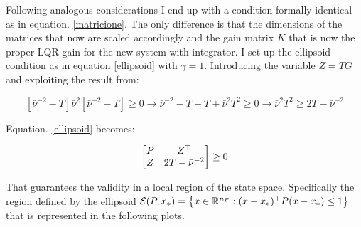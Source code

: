 \documentclass{article}
\begin{document}
Following analogous considerations I end up with a condition formally identical as in equation. \ref{matricione}. The only difference is that the dimensions of the matrices that now are scaled accordingly and the gain matrix $K$ that is now the proper LQR gain for the new system with integrator. I set up the ellipsoid condition as in equation \ref{ellipsoid} with $\gamma = 1$. Introducing the variable $Z = TG$ and exploiting the result from:

$$
  \left[ \bar{\nu}^{-2} - T \right] \bar{\nu}^{2} \left[ \bar{\nu}^{-2} - T \right] \geq 0 \to \bar{\nu}^{-2} - T - T + \bar{\nu}^{2} T^{2} \geq 0 \to \bar{\nu}^{2} T^{2} \geq 2 T - \bar{\nu}^{-2}
$$

Equation. \ref{ellipsoid} becomes:

\begin{equation}
  \left[\begin{matrix}
    P & Z^\top \\
    Z & 2 T - \bar{\nu}^{-2} 
  \end{matrix}\right] \geq 0
\end{equation}

That guarantees the validity in a local region of the state space. Specifically the region defined by the ellipsoid ${\mathcal{E}}(P, x_*) = \left\{ x \in {\mathbb{R}}^{n_{F}} : (x - x_*)^\top P (x - x_*) \leq 1 \right\}$ that is represented in the following plots.
\end{document}
